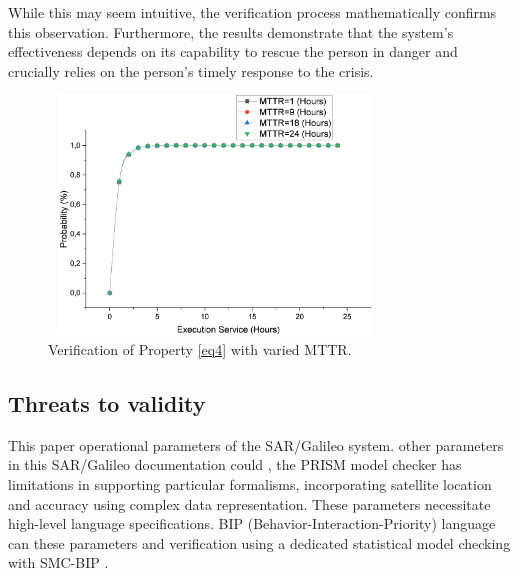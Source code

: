 While this may seem intuitive, the verification process mathematically confirms this observation. Furthermore, the results demonstrate that the system's effectiveness depends on its capability to rescue the person in danger and crucially relies on the person's timely response to the crisis.



\begin{figure}[htbp]
     \centering
   		\includegraphics[width=250pt, height =180pt]{Graphh.pdf}
    \caption{Verification of Property \ref{eq4} with varied MTTR.}
    \label{fig:03}
 \end{figure} 

\subsection{Threats to validity}

This paper  operational parameters of the SAR/Galileo system.  other parameters  in this SAR/Galileo documentation could , the PRISM model checker has limitations in supporting particular formalisms,  incorporating satellite location and accuracy using complex data representation. These parameters necessitate high-level language specifications.  BIP \cite{basurigorous2011} (Behavior-Interaction-Priority) language can  these parameters and  verification using a dedicated statistical model checking with SMC-BIP \cite{med2018}. 